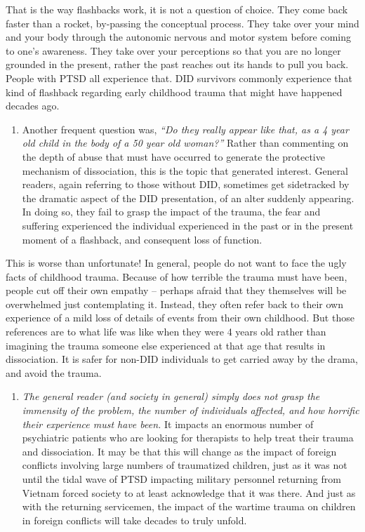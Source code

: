\documentclass[]{book}
\providecommand{\tightlist}{%
  \setlength{\itemsep}{0pt}\setlength{\parskip}{0pt}}
\begin{document}
That is the way flashbacks work, it is not a question of choice. They come back faster than a rocket, by-passing the conceptual process. They take over your mind and your body through the autonomic nervous and motor system before coming to one's awareness. They take over your perceptions so that you are no longer grounded in the present, rather the past reaches out its hands to pull you back. People with PTSD all experience that. DID survivors commonly experience that kind of flashback regarding early childhood trauma that might have happened decades ago.

\begin{enumerate}
\def\labelenumi{\arabic{enumi}.}
\setcounter{enumi}{1}
\tightlist
\item
  Another frequent question was, \emph{``Do they really appear like that, as a 4 year old child in the body of a 50 year old woman?''} Rather than commenting on the depth of abuse that must have occurred to generate the protective mechanism of dissociation, this is the topic that generated interest. General readers, again referring to those without DID, sometimes get sidetracked by the dramatic aspect of the DID presentation, of an alter suddenly appearing. In doing so, they fail to grasp the impact of the trauma, the fear and suffering experienced the individual experienced in the past or in the present moment of a flashback, and consequent loss of function.
\end{enumerate}

This is worse than unfortunate! In general, people do not want to face the ugly facts of childhood trauma. Because of how terrible the trauma must have been, people cut off their own empathy -- perhaps afraid that they themselves will be overwhelmed just contemplating it. Instead, they often refer back to their own experience of a mild loss of details of events from their own childhood. But those references are to what life was like when they were 4 years old rather than imagining the trauma someone else experienced at that age that results in dissociation. It is safer for non-DID individuals to get carried away by the drama, and avoid the trauma.

\begin{enumerate}
\def\labelenumi{\arabic{enumi}.}
\setcounter{enumi}{2}
\tightlist
\item
  \emph{The general reader (and society in general) simply does not grasp the immensity of the problem, the number of individuals affected, and how horrific their experience must have been.} It impacts an enormous number of psychiatric patients who are looking for therapists to help treat their trauma and dissociation. It may be that this will change as the impact of foreign conflicts involving large numbers of traumatized children, just as it was not until the tidal wave of PTSD impacting military personnel returning from Vietnam forced society to at least acknowledge that it was there. And just as with the returning servicemen, the impact of the wartime trauma on children in foreign conflicts will take decades to truly unfold.
\end{enumerate}
\end{document}
